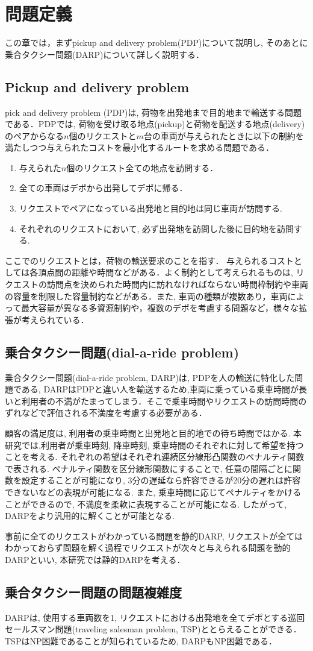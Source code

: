 \chapter{問題定義}\label{definition}
この章では，まずpickup and delivery problem(PDP)について説明し, そのあとに乗合タクシー問題(DARP)について詳しく説明する．
\section{Pickup and delivery problem}
pick and delivery problem (PDP)は, 荷物を出発地まで目的地まで輸送する問題である．PDPでは, 荷物を受け取る地点(pickup)と荷物を配送する地点(delivery)のペアからなる$n$個のリクエストと$m$台の車両が与えられたときに以下の制約を満たしつつ与えられたコストを最小化するルートを求める問題である．
\begin{enumerate}
 \item 与えられた$n$個のリクエスト全ての地点を訪問する．
 \item 全ての車両はデポから出発してデポに帰る．
 \item リクエストでペアになっている出発地と目的地は同じ車両が訪問する.
 \item それぞれのリクエストにおいて, 必ず出発地を訪問した後に目的地を訪問する.
\end{enumerate}
ここでのリクエストとは，荷物の輸送要求のことを指す．
与えられるコストとしては各頂点間の距離や時間などがある．よく制約として考えられるものは, リクエストの訪問点を決められた時間内に訪れなければならない時間枠制約や車両の容量を制限した容量制約などがある．また, 車両の種類が複数あり，車両によって最大容量が異なる多資源制約や，複数のデポを考慮する問題など，様々な拡張が考えられている．

\section{乗合タクシー問題(dial-a-ride problem)}
乗合タクシー問題(dial-a-ride problem, DARP)は, PDPを人の輸送に特化した問題である, DARPはPDPと違い人を輸送するため,車両に乗っている乗車時間が長いと利用者の不満がたまってしまう．そこで乗車時間やリクエストの訪問時間のずれなどで評価される不満度を考慮する必要がある．

顧客の満足度は, 利用者の乗車時間と出発地と目的地での待ち時間ではかる. 本研究では,利用者が乗車時刻, 降車時刻, 乗車時間のそれぞれに対して希望を持つことを考える. それぞれの希望はそれぞれ連続区分線形凸関数のペナルティ関数で表される. ペナルティ関数を区分線形関数にすることで, 任意の間隔ごとに関数を設定することが可能になり, 3分の遅延なら許容できるが20分の遅れは許容できないなどの表現が可能になる. また, 乗車時間に応じてペナルティをかけることができるので, 不満度を柔軟に表現することが可能になる. したがって, DARPをより汎用的に解くことが可能となる.

事前に全てのリクエストがわかっている問題を静的DARP, リクエストが全てはわかっておらず問題を解く過程でリクエストが次々と与えられる問題を動的DARPといい, 本研究では静的DARPを考える．

\section{乗合タクシー問題の問題複雑度}
DARPは, 使用する車両数を1, リクエストにおける出発地を全てデポとする巡回セールスマン問題(traveling salesman problem, TSP)ととらえることができる．TSPはNP困難\cite{TSP}であることが知られているため, DARPもNP困難である．
